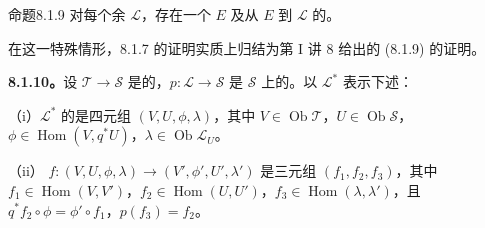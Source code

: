 \begin{SGAresult}{命题}{8.1.9}
对每个余 $\mathscr L$，存在一个 $E$ 及从 $E$ 到 $\mathscr L$ 的。
\end{SGAresult}
在这一特殊情形，8.1.7 的证明实质上归结为第 I 讲 8 给出的 (8.1.9) 的证明。

\textbf{8.1.10。}设 $\mathscr T\to\mathscr S$ 是的，$p:\mathscr L\to\mathscr S$ 是 $\mathscr S$ 上的。以 $\mathscr L^*$ 表示下述：

（i）$\mathscr L^*$ 的是四元组 $(V,U,\phi,\lambda)$，其中 $V\in\operatorname{Ob}\mathscr T$，$U\in\operatorname{Ob}\mathscr S$，$\phi\in\operatorname{Hom}(V,q^*U)$，$\lambda\in\operatorname{Ob}\mathscr L_U$。

（ii） $f:(V,U,\phi,\lambda)\to(V',\phi',U',\lambda')$ 是三元组 $(f_1,f_2,f_3)$，其中 $f_1\in\operatorname{Hom}(V,V')$，$f_2\in\operatorname{Hom}(U,U')$，$f_3\in\operatorname{Hom}(\lambda,\lambda')$，且 $q^*f_2\circ\phi=\phi'\circ f_1$，$p(f_3)=f_2$。

